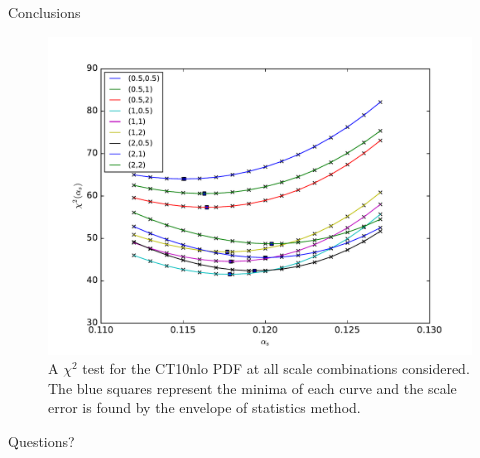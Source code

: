 \documentclass[14pt]{beamer}
\begin{document}
\begin{frame}[fragile]{Conclusions}
	

\begin{figure} 
	\begin{center}
		\includegraphics[width=0.7 \textwidth]{CT10nlo0_curvefit.pdf}
		\caption{A ${\chi ^2}$ test for the CT10nlo PDF at all scale combinations considered. The blue squares represent the minima of each curve and the scale error is found by the envelope of statistics method.}
		\label{CHI}
	\end{center}
\end{figure}

\end{frame}

{
\begin{frame}[standout]
  Questions?
\end{frame}
}

\appendix
\end{document}
